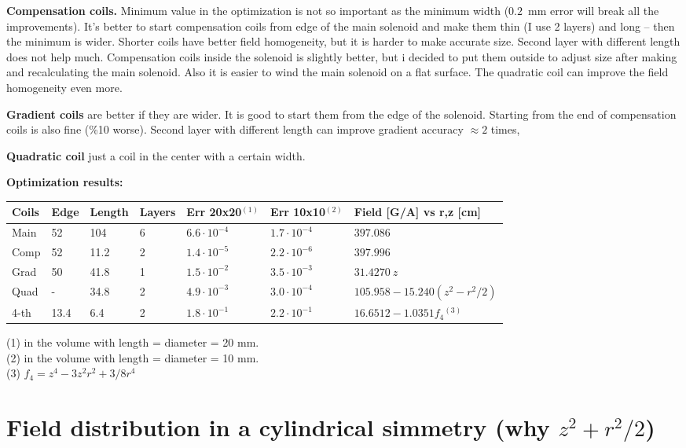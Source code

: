 \documentclass[a4paper]{article}
\begin{document}
{\bf Compensation coils.} Minimum value in the optimization is not so
important as the minimum width ($0.2$~mm error will break all the
improvements). It's better to start compensation coils from edge of the
main solenoid and make them thin (I use 2 layers) and long -- then the
minimum is wider. Shorter coils have better field homogeneity, but it is
harder to make accurate size. Second layer with different length does not
help much. Compensation coils inside the solenoid is slightly better, but
i decided to put them outside to adjust size after making and
recalculating the main solenoid. Also it is easier to wind the main solenoid
on a flat surface. The quadratic coil can improve the field
homogeneity even more.

{\bf Gradient coils} are better if they are wider. It is good to start
them from the edge of the solenoid. Starting from the end of compensation
coils is also fine (\%10 worse). Second layer with different length can
improve gradient accuracy $\approx 2$ times,

{\bf Quadratic coil} just a coil in the center with a certain width.

{\bf Optimization results:}\\
\medskip
\begin{tabular}{lllllll}
Coils & Edge &Length       & Layers & Err 20x20$^{(1)}$  & Err 10x10$^{(2)}$        & Field [G/A] vs r,z [cm] \\\hline
Main  & 52   & 104         & 6      & $6.6\cdot10^{-4}$ & $1.7\cdot10^{-4}$ & $397.086$\\
Comp  & 52   & 11.2        & 2      & $1.4\cdot10^{-5}$ & $2.2\cdot10^{-6}$ & $397.996$\\
Grad  & 50   & 41.8        & 1      & $1.5\cdot10^{-2}$ & $3.5\cdot10^{-3}$ & $31.4270\ z$\\
Quad  & -    & 34.8        & 2      & $4.9\cdot10^{-3}$ & $3.0\cdot10^{-4}$ & $105.958 - 15.240 (z^2-r^2/2)$\\
4-th  & 13.4 & 6.4         & 2      & $1.8\cdot10^{-1}$ & $2.2\cdot10^{-1}$ & $16.6512 - 1.0351 f_4$$^{(3)}$\\
\end{tabular}
\medskip

\noindent
(1) in the volume with length = diameter = 20 mm.\\
(2) in the volume with length = diameter = 10 mm.\\
(3) $f_4 = z^4 - 3 z^2 r^2 + 3/8 r^4$


\section*{Field distribution in a cylindrical simmetry (why $z^2+r^2/2$)}
\end{document}
